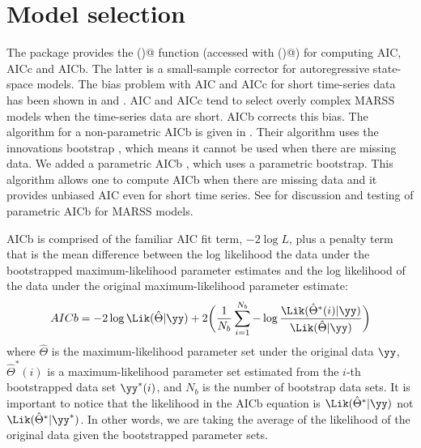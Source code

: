 \section{Model selection}
The package provides the \verb@MARSSaic()@ function (accessed with \verb@AIC()@) for computing AIC, AICc and AICb.  The latter is a small-sample corrector for autoregressive state-space models.  The bias problem with AIC and AICc for short time-series data has been shown in \citet{CavanaughShumway1997} and \citet{HolmesWard2010}.  AIC and AICc tend to select overly complex MARSS models when the time-series data are short.  AICb corrects this bias.  The algorithm for a non-parametric AICb is given in \citet{CavanaughShumway1997}.  Their algorithm uses the innovations bootstrap \citep{StofferWall1991}, which means it cannot be used when there are missing data.  We added a parametric AICb \citep{HolmesWard2010}, which uses a parametric bootstrap. This algorithm allows one to compute AICb when there are missing data and it provides unbiased AIC even for short time series.  See \citet{HolmesWard2010} for discussion and testing of parametric AICb for MARSS models. 

AICb is comprised of the familiar AIC fit term, $-2 \log L$, plus a penalty term that is the mean difference between the log likelihood the data under the bootstrapped maximum-likelihood parameter estimates and the log likelihood of the data under the original maximum-likelihood parameter estimate:
\begin{equation}
	AICb = -2 \log \Lik(\hat{\Theta} | \yy) + 2 \bigg( \frac{1}{N_b}\sum_{i=1}^{N_b} -\log \frac{\Lik(\hat{\Theta}^*(i) | \yy)}{\Lik(\hat{\Theta} | \yy)}\bigg)
\label{eq:AICb}
\end{equation}
where $\hat{\Theta}$ is the maximum-likelihood parameter set under the original data $\yy$, $\hat{\Theta}^*(i)$ is a maximum-likelihood parameter set estimated from the $i$-th bootstrapped data set $\yy^*(i)$, and $N_b$ is the number of bootstrap data sets.  It is important to notice that the likelihood in the AICb equation is $\Lik(\hat{\Theta}^* | \yy)$ not $\Lik(\hat{\Theta}^* | \yy^*)$.  In other words, we are taking the average of the likelihood of the original data given the bootstrapped parameter sets. 

